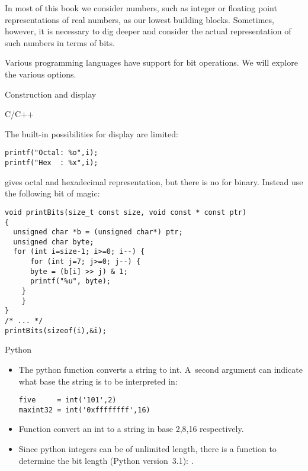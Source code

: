 

In most of this book we consider numbers, such as integer or floating
point representations of real numbers, as our lowest building
blocks. Sometimes, however, it is necessary to dig deeper and consider
the actual representation of such numbers in terms of bits.

Various programming languages have support for bit operations.
We will explore the various options.

 {Construction and display}

 {C/C++}

The built-in possibilities for display are limited:
\begin{lstlisting}
printf("Octal: %o",i);
printf("Hex  : %x",i);
\end{lstlisting}
gives octal and hexadecimal representation, but there is no
for binary. Instead use the following bit of magic:
\begin{lstlisting}
void printBits(size_t const size, void const * const ptr)
{
  unsigned char *b = (unsigned char*) ptr;
  unsigned char byte;
  for (int i=size-1; i>=0; i--) {
      for (int j=7; j>=0; j--) {
	  byte = (b[i] >> j) & 1;
	  printf("%u", byte);
	}
    }
}
/* ... */
printBits(sizeof(i),&i);  
\end{lstlisting}

 {Python}

\begin{itemize}
\item The python  function converts a string to
  int. A~second argument can indicate what base the string is to be
  interpreted in:
\begin{lstlisting}
five     = int('101',2)
maxint32 = int('0xffffffff',16)
\end{lstlisting}
\item Function  
  convert an int to a string in base 2,8,16 respectively.
\item Since python integers can be of unlimited length, there is a
  function to determine the bit length (Python version~3.1):
  .
\end{itemize}

